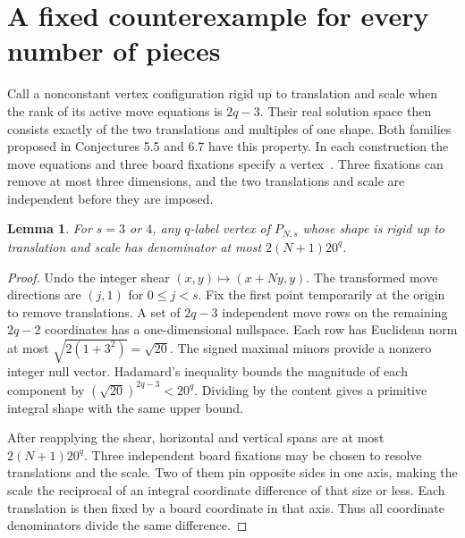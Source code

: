 \documentclass[11pt]{article}
\newtheorem{lemma}[theorem]{Lemma}
\begin{document}
\section{A fixed counterexample for every number of pieces}
Call a nonconstant vertex configuration rigid up to translation and scale when the rank of its active move equations is $2q-3$. Their real solution space then consists exactly of the two translations and multiples of one shape. Both families proposed in Conjectures 5.5 and 6.7 have this property. In each construction the move equations and three board fixations specify a vertex~\cite[\S\S5.2,6]{chz}. Three fixations can remove at most three dimensions, and the two translations and scale are independent before they are imposed.

\begin{lemma}\label{l:shear}
For $s=3$ or $4$, any $q$-label vertex of $P_{N,s}$ whose shape is rigid up to translation and scale has denominator at most $2(N+1)20^q$.
\end{lemma}
\begin{proof}
Undo the integer shear $(x,y)\mapsto(x+Ny,y)$. The transformed move directions are $(j,1)$ for $0\le j<s$. Fix the first point temporarily at the origin to remove translations. A set of $2q-3$ independent move rows on the remaining $2q-2$ coordinates has a one-dimensional nullspace. Each row has Euclidean norm at most $\sqrt{2(1+3^2)}=\sqrt{20}$. The signed maximal minors provide a nonzero integer null vector. Hadamard's inequality bounds the magnitude of each component by $(\sqrt{20})^{2q-3}<20^q$. Dividing by the content gives a primitive integral shape with the same upper bound.

After reapplying the shear, horizontal and vertical spans are at most $2(N+1)20^q$. Three independent board fixations may be chosen to resolve translations and the scale. Two of them pin opposite sides in one axis, making the scale the reciprocal of an integral coordinate difference of that size or less. Each translation is then fixed by a board coordinate in that axis. Thus all coordinate denominators divide the same difference.
\end{proof}
\end{document}
